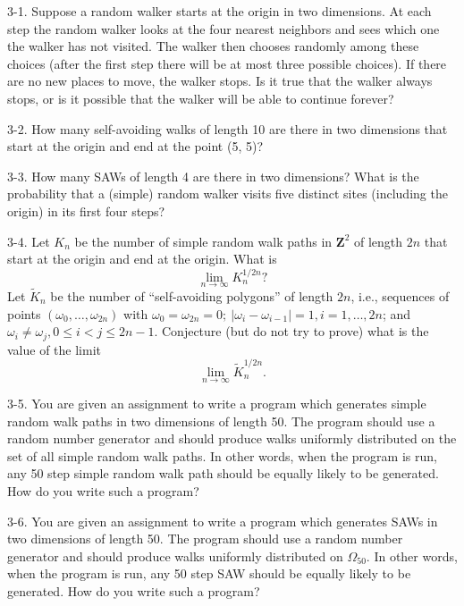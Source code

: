 \documentclass{stml-l}
\theoremstyle{definition}
\numberwithin{equation}{chapter}
\numberwithin{figure}{chapter}
\numberwithin{figure}{section}
\begin{document}
3-1. Suppose a random walker starts at the origin in two dimensions.
At each step the random walker looks at the four nearest neighbors
and sees which one the walker has not visited. The walker then
chooses randomly among these choices (after the first step there
will be at most three possible choices). If there are no new places
to move, the walker stops. Is it true that the walker always stops,
or is it possible that the walker will be able to continue forever?

3-2. How many self-avoiding walks of length 10 are there in two
dimensions that start at the origin and end at the point (5, 5)?

3-3. How many SAWs of length 4 are there in two dimensions? What is
the probability that a (simple) random walker visits five distinct
sites (including the origin) in its first four steps?

3-4. Let $K_{n}$ be the number of simple random walk paths in
$\mathbf{Z}^{2}$ of length $2n$ that start at the origin and end at
the origin. What is
\begin{equation*}
\lim\limits_{n\rightarrow\infty}K_{n}^{1/2n}?
\end{equation*}
Let $\tilde{K}_{n}$ be the number of ``self-avoiding polygons'' of
length $2n$, i.e., sequences of points
$(\omega_{0},\ldots,\omega_{2n})$ with $\omega_{0}=\omega_{2n}=0;\
|\omega_{i}-\omega_{i-1}|= 1,i=1,\ldots,2n$; and
$\omega_{i}\neq\omega_{j},0\leq i<j\leq 2n-1$. Conjecture (but do
not try to prove) what is the value of the limit
\begin{equation*}
\lim\limits_{n\rightarrow\infty}\tilde{K}_{n}^{1/2n}.
\end{equation*}

3-5. You are given an assignment to write a program which generates
simple random walk paths in two dimensions of length 50. The program
should use a random number generator and should produce walks
uniformly distributed on the set of all simple random walk paths. In
other words, when the program is run, any 50 step simple random walk
path should be equally likely to be generated. How do you write such
a program?

3-6. You are given an assignment to write a program which generates
SAWs in two dimensions of length 50. The program should use a random
number generator and should produce walks uniformly distributed on
$\Omega_{50}$. In other words, when the program is run, any 50 step
SAW should be equally likely to be generated. How do you write such
a program?
\end{document}
